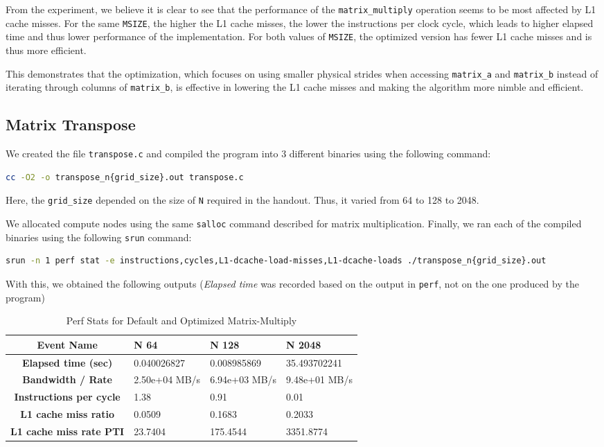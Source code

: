 \documentclass[a4paper,10pt]{article}
\begin{document}
From the experiment, we believe it is clear to see that the performance of the \verb|matrix_multiply| operation seems to be most affected by L1 cache misses. For the same \verb|MSIZE|, the higher the L1 cache misses, the lower the instructions per clock cycle, which leads to higher elapsed time and thus lower performance of the implementation. For both values of \verb|MSIZE|, the optimized version has fewer L1 cache misses and is thus more efficient.  

This demonstrates that the optimization, which focuses on using smaller physical strides when accessing \verb|matrix_a| and \verb|matrix_b| instead of iterating through columns of \verb|matrix_b|, is effective in lowering the L1 cache misses and making the algorithm more nimble and efficient. 

\subsection{Matrix Transpose}
\label{sec:matrix_transpose}
We created the file \verb|transpose.c| and compiled the program into 3 different binaries using the following command: 
\begin{lstlisting}[language=bash,basicstyle=\ttfamily]
cc -O2 -o transpose_n{grid_size}.out transpose.c
\end{lstlisting}
Here, the \verb|grid_size| depended on the size of \verb|N| required in the handout. Thus, it varied from 64 to 128 to 2048. 

We allocated compute nodes using the same \verb|salloc| command described for matrix multiplication. Finally, we ran each of the compiled binaries using the following \verb|srun| command: 
\begin{lstlisting}[language=bash,basicstyle=\tiny\ttfamily]
srun -n 1 perf stat -e instructions,cycles,L1-dcache-load-misses,L1-dcache-loads ./transpose_n{grid_size}.out
\end{lstlisting}
With this, we obtained the following outputs (\textit{Elapsed time} was recorded based on the output in \verb|perf|, not on the one produced by the program)
\begin{table}[h!]
\centering
\begin{tabular}{|c|p{2.5cm}|p{2.5cm}|p{2.5cm}|}
\hline
\textbf{Event Name} & \textbf{N 64} & \textbf{N 128} & \textbf{N 2048}  \\
\hline
\textbf{Elapsed time (sec)} & 0.040026827 & 0.008985869 & 35.493702241  \\
\hline
\textbf{Bandwidth / Rate} & 2.50e+04 MB/s & 6.94e+03 MB/s & 9.48e+01 MB/s \\
\hline
\textbf{Instructions per cycle} & 1.38 & 0.91 & 0.01 \\ 
\hline
\textbf{L1 cache miss ratio} & 0.0509 & 0.1683 & 0.2033 \\
\hline
\textbf{L1 cache miss rate PTI} & 23.7404 & 175.4544 & 3351.8774  \\
\hline
\end{tabular}
\caption{Perf Stats for Default and Optimized Matrix-Multiply}
\end{table}
\end{document}
